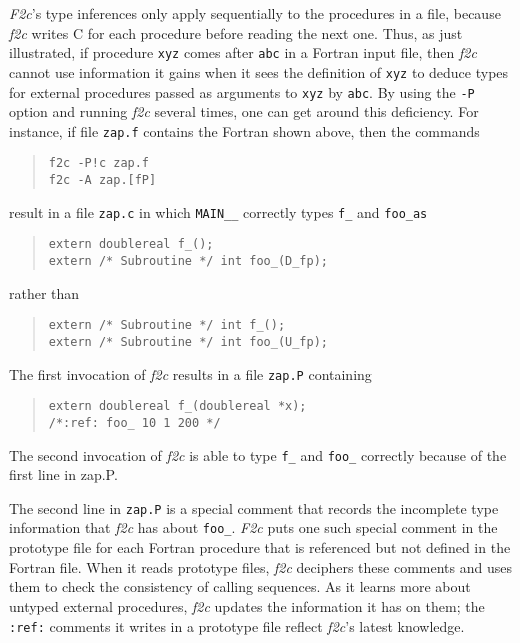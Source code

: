 \documentclass[10pt,a4paper]{article}
\begin{document}
\emph{F2c}’s type inferences only apply sequentially to the procedures in a file, because \emph{f2c} writes C for each procedure before reading the next one. Thus, as just illustrated, if procedure \verb|xyz| comes after \verb|abc| in a Fortran input file, then \emph{f2c} cannot use information it gains when it sees the definition of \verb|xyz| to deduce types for external procedures passed as arguments to \verb|xyz| by \verb|abc|. By using the \verb|-P| option and running \emph{f2c} several times, one can get around this deficiency. For instance, if file \verb|zap.f| contains the Fortran shown above, then the commands
\begin{quote}
\begin{verbatim}
f2c -P!c zap.f
f2c -A zap.[fP]
\end{verbatim}
\end{quote}
result in a file \verb|zap.c| in which \verb|MAIN__| correctly types \verb|f_| and \verb|foo_as|
\begin{quote}
\begin{verbatim}
extern doublereal f_();
extern /* Subroutine */ int foo_(D_fp);
\end{verbatim}
\end{quote}
rather than
\begin{quote}
\begin{verbatim}
extern /* Subroutine */ int f_();
extern /* Subroutine */ int foo_(U_fp);
\end{verbatim}
\end{quote}
The first invocation of \emph{f2c} results in a file \verb|zap.P| containing
\begin{quote}
\begin{verbatim}
extern doublereal f_(doublereal *x);
/*:ref: foo_ 10 1 200 */
\end{verbatim}
\end{quote}
The second invocation of \emph{f2c} is able to type \verb|f_| and \verb|foo_| correctly because of the first line in zap.P.

The second line in \verb|zap.P| is a special comment that records the incomplete type information that \emph{f2c} has about \verb|foo_|. \emph{F2c} puts one such special comment in the prototype file for each Fortran procedure that is referenced but not defined in the Fortran file. When it reads prototype files, \emph{f2c} deciphers these comments and uses them to check the consistency of calling sequences. As it learns more about untyped external procedures, \emph{f2c} updates the information it has on them; the \verb|:ref:| comments it writes in a prototype file reflect \emph{f2c}’s latest knowledge.
\end{document}
